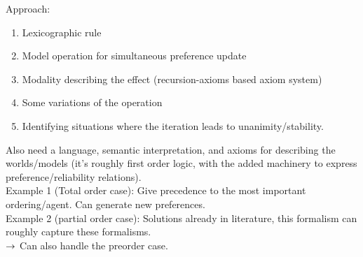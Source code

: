 Approach:
\begin{enumerate}
    \item Lexicographic rule
    \item Model operation for simultaneous preference update
    \item Modality describing the effect (recursion-axioms based axiom system)
    \item Some variations of the operation
    \item Identifying situations where the iteration leads to unanimity/stability.
\end{enumerate}



Also need a language, semantic interpretation, and axioms for describing the worlds/models (it's roughly first order logic, with the added machinery to express preference/reliability relations). \\


Example 1 (Total order case): Give precedence to the most important ordering/agent. Can generate new preferences. \\

Example 2 (partial order case): Solutions already in literature, this formalism can roughly capture these formalisms. \\

$\rightarrow$ Can also handle the preorder case.

